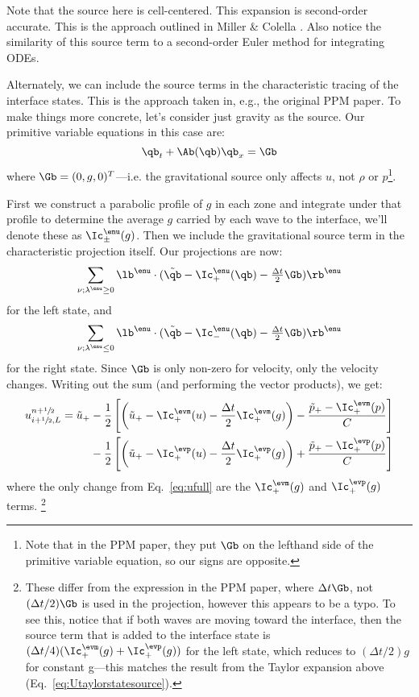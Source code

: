 Note that the source here is cell-centered.  This expansion is
second-order accurate.  This is the approach outlined in Miller
\& Colella \cite{millercolella:2002}.  Also notice the
similarity of this source term to a second-order Euler method
for integrating ODEs.

Alternately, we can include the source terms in the characteristic
tracing of the interface states.  This is the approach taken in, e.g.,
the original PPM paper.  To make things more concrete, let's consider just
gravity as the source.  Our primitive variable equations in this case are:
\begin{equation}
\qb_t + \Ab(\qb) \qb_x = \Gb
\end{equation}
where $\Gb = (0, g, 0)^T$---i.e. the gravitational source only affects
$u$, not $\rho$ or $p$\footnote{Note that in the PPM paper, they put $\Gb$ on
the lefthand side of the primitive variable equation, so our signs are
opposite.}.

First we construct a parabolic profile of $g$ in each zone and
integrate under that profile to determine the average $g$ carried by
each wave to the interface, we'll denote these as $\Ic^\enu_\pm(g)$.  Then we include the gravitational source
term in the characteristic projection itself.  Our projections are
now:
\begin{equation}
\sum_{\nu; \lambda^\enu \ge 0}\lb^\enu \cdot (\tilde{\qb} - \Ic^\enu_+(\qb) - \tfrac{\Delta t}{2} \Gb) \rb^\enu
\end{equation}
for the left state, and
\begin{equation}
\sum_{\nu; \lambda^\enu \le 0} \lb^\enu \cdot (\tilde{\qb} - \Ic^\enu_-(\qb) - \tfrac{\Delta t}{2} \Gb) \rb^\enu
\end{equation}
for the right state.  Since $\Gb$ is only non-zero for velocity, only
the velocity changes.  Writing out the sum (and performing the vector products), we
get:
\begin{align}
u_{i+\myhalf,L}^{n+\myhalf} =
   \tilde{u}_+
  &- \frac{1}{2} \left [
      \left (\tilde{u}_+ - \Ic_+^\evm(u) - \frac{\Delta t}{2} \Ic^\evm_+(g) \right ) -
       \frac{\tilde{p}_+ - \Ic_+^\evm(p)}{C} \right ] \nonumber \\
  &- \frac{1}{2} \left [
      \left (\tilde{u}_+ - \Ic_+^\evp(u) - \frac{\Delta t}{2} \Ic^\evp_+(g) \right ) +
       \frac{\tilde{p}_+ - \Ic_+^\evp(p)}{C} \right ]
\end{align}
where the only change from Eq.~\ref{eq:ufull} are the
$\Ic^\evm_+(g)$ and $\Ic^\evp_+(g)$ terms.
\footnote{These differ from the expression in the PPM paper, where $\Delta t \Gb$,
not $(\Delta t/2) \Gb$ is used in the projection, however this appears to
be a typo.  To see this, notice that if both waves are moving toward
the interface, then the source term that is added to the interface
state is $(\Delta t/4) (\Ic_+^\evm(g) +
\Ic_+^\evp(g))$ for the left state, which reduces to $(\Delta
t/2) g$ for constant g---this matches the result from the Taylor
expansion above (Eq.~\ref{eq:Utaylorstatesource}).}

